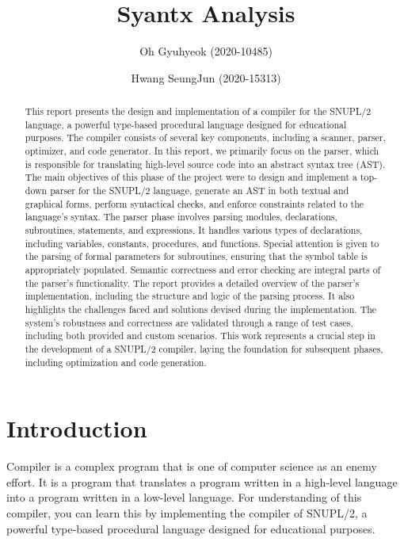 \documentclass[12pt]{article}
\title{Syantx Analysis}
\author{Oh Gyuhyeok (2020-10485)}
\author{Hwang SeungJun (2020-15313)}
\affil{SNUCSE}
\date{}
\begin{document}
\maketitle

\begin{abstract}
    This report presents the design and implementation of a compiler for the SNUPL/2 language, a powerful type-based procedural language designed for educational purposes.
    The compiler consists of several key components, including a scanner, parser, optimizer, and code generator.
    In this report, we primarily focus on the parser, which is responsible for translating high-level source code into an abstract syntax tree (AST).
    The main objectives of this phase of the project were to design and implement a top-down parser for the SNUPL/2 language, generate an AST in both textual and graphical forms, perform syntactical checks, and enforce constraints related to the language's syntax.
    The parser phase involves parsing modules, declarations, subroutines, statements, and expressions.
    It handles various types of declarations, including variables, constants, procedures, and functions. Special attention is given to the parsing of formal parameters for subroutines, ensuring that the symbol table is appropriately populated.
    Semantic correctness and error checking are integral parts of the parser's functionality.
    The report provides a detailed overview of the parser's implementation, including the structure and logic of the parsing process.
    It also highlights the challenges faced and solutions devised during the implementation.
    The system's robustness and correctness are validated through a range of test cases, including both provided and custom scenarios.
    This work represents a crucial step in the development of a SNUPL/2 compiler, laying the foundation for subsequent phases, including optimization and code generation.
\end{abstract}

\section{Introduction}
Compiler is a complex program that is one of computer science as an enemy effort.
It is a program that translates a program written in a high-level language into a program written in a low-level language.
For understanding of this compiler, you can learn this by implementing the compiler of SNUPL/2\cite{Egger_git}, a powerful type-based procedural language designed for educational purposes.\\
\end{document}
